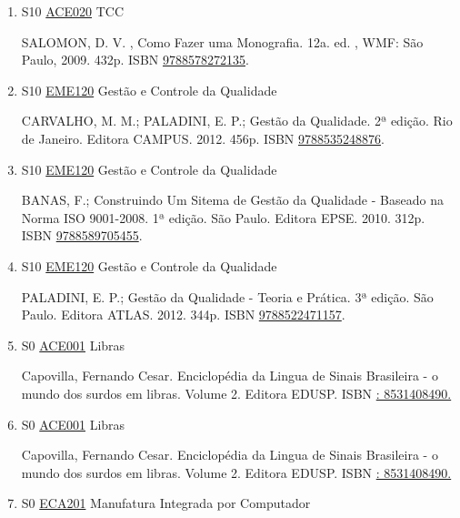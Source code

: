 \documentclass[12pt,a4paper]{book}
\begin{document}
\begin{enumerate}
 
 \item S10 \hyperref[PUD:ACE020]{ACE020} TCC

 SALOMON, D.  V. , Como Fazer uma Monografia.  12a.  ed. , WMF: São Paulo, 2009.  432p.   ISBN \href{http://www.bn.br/site/pages/servicosProfissionais/agenciaISBN/isbnBusca/FbnBuscaISBNCatalogo.asp?pField=ISBN&pIntPagina=1&pISBN=78272135&nidbISBN=true&hidbISBN=true}{9788578272135}.
 \item S10 \hyperref[PUD:EME120]{EME120} Gestão e Controle da Qualidade

 CARVALHO, M.  M.;  PALADINI, E.  P.;  Gestão da Qualidade.  2ª edição.  Rio de Janeiro.  Editora CAMPUS.  2012.  456p.  ISBN \href{http://www.bn.br/site/pages/servicosProfissionais/agenciaISBN/isbnBusca/FbnBuscaISBNCatalogo.asp?pField=ISBN&pIntPagina=1&pISBN=35248876&nidbISBN=true&hidbISBN=true}{9788535248876}. 
 
 
 \item S10 \hyperref[PUD:EME120]{EME120} Gestão e Controle da Qualidade

 BANAS, F.;  Construindo Um Sitema de Gestão da Qualidade - Baseado na Norma ISO 9001-2008.  1ª edição.  São Paulo.  Editora EPSE.  2010.  312p.  ISBN \href{http://www.bn.br/site/pages/servicosProfissionais/agenciaISBN/isbnBusca/FbnBuscaISBNCatalogo.asp?pField=ISBN&pIntPagina=1&pISBN=89705455&nidbISBN=true&hidbISBN=true}{9788589705455}. 
 
 
 \item S10 \hyperref[PUD:EME120]{EME120} Gestão e Controle da Qualidade

 PALADINI, E.  P.;  Gestão da Qualidade - Teoria e Prática.  3ª edição.  São Paulo.  Editora ATLAS.  2012.  344p.  ISBN \href{http://www.bn.br/site/pages/servicosProfissionais/agenciaISBN/isbnBusca/FbnBuscaISBNCatalogo.asp?pField=ISBN&pIntPagina=1&pISBN=22471157&nidbISBN=true&hidbISBN=true}{9788522471157}.
 \item S0 \hyperref[PUD:ACE001]{ACE001} Libras

  Capovilla, Fernando Cesar.  Enciclopédia da Lingua de Sinais Brasileira - o mundo dos surdos em libras.  Volume 2.  Editora EDUSP.  ISBN \href{http://www.google.com/search?hl=pt-BR&tbo=p&tbm=bks&q=isbn:: 8531408490.&num=10}{: 8531408490.}
 \item S0 \hyperref[PUD:ACE001]{ACE001} Libras

  Capovilla, Fernando Cesar.  Enciclopédia da Lingua de Sinais Brasileira - o mundo dos surdos em libras.  Volume 2.  Editora EDUSP.  ISBN \href{http://www.google.com/search?hl=pt-BR&tbo=p&tbm=bks&q=isbn:: 8531408490.&num=10}{: 8531408490.}
 \item S0 \hyperref[PUD:ECA201]{ECA201} Manufatura Integrada por Computador


\end{enumerate}
\end{document}
